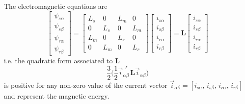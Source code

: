 \documentclass[11pt,a4paper]{scrartcl}
\numberwithin{equation}{section}
\theoremstyle{it}
\theoremstyle{definition}
\begin{document}
\begin{onehalfspace}
The electromagnetic equations are
\begin{equation}\label{im_eq_21}
	\left[\begin{matrix}
		\psi_{s\alpha} \\[6pt]
		\psi_{s\beta} \\[6pt]
		\psi_{r\alpha} \\[6pt]
		\psi_{r\beta}
	\end{matrix}\right] = 
	\left[\begin{matrix}
		L_s & 0 & L_m & 0 \\[6pt]
		0 & L_s & 0 & L_m \\[6pt]
		L_m & 0 & L_r & 0 \\[6pt]
		0 & L_m & 0 & L_r 
	\end{matrix}\right]
	\left[\begin{matrix}
		i_{s\alpha} \\[6pt]
		i_{s\beta} \\[6pt]
		i_{r\alpha} \\[6pt]
		i_{r\beta} 
	\end{matrix}\right] = \mathbf{L}
	\left[\begin{matrix}
		i_{s\alpha} \\[6pt]
		i_{s\beta} \\[6pt]
		i_{r\alpha} \\[6pt]
		i_{r\beta} 
	\end{matrix}\right]
\end{equation}
i.e. the quadratic form associated to $\mathbf{L}$
\begin{equation}\label{im_eq_22}
	\frac{3}{2}\Bigg(\frac{1}{2}\vec{i}_{\alpha\beta}^{\,\,T} 
	\,\mathbf{L}\vec{i}_{\alpha\beta}\Bigg)
\end{equation}
is positive for any non-zero value of the current vector 
$\vec{i}_{\alpha\beta}=[i_{s\alpha},\,i_{s\beta},\,i_{r\alpha},\,i_{r\beta}]$ 
and represent the magnetic energy.


\end{onehalfspace}
\end{document}
